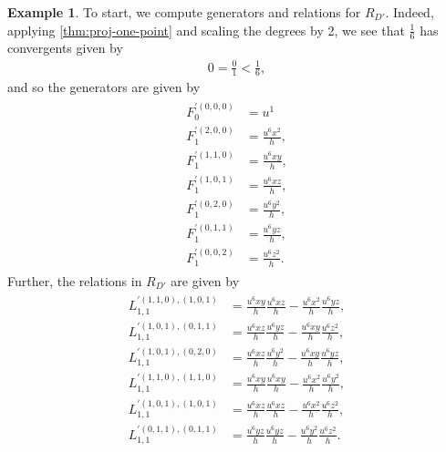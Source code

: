 \documentclass{amsart}
\theoremstyle{plain}
\theoremstyle{definition}
\newtheorem{example}[thm]{Example}
\theoremstyle{remark}
\numberwithin{equation}{subsection}
\begin{document}
\begin{example}
	To start, we compute generators and relations for $R_{D'}$.
	Indeed, applying \ref{thm:proj-one-point} and scaling
	the degrees by 2, we see that $\frac{1}{6}$ has convergents
	given by
	\begin{align*}
		0 = \frac{0}{1} < \frac{1}{6},
	\end{align*}
	and so the generators are given by 
	\begin{align}
	\begin{aligned}
	\label{equation:d'-generators}
		F_0^{'(0,0,0)} &= u^1 \\
		F_1^{'(2,0,0)} &= \frac{u^6 x^2}{h}, \\
		F_1^{'(1,1,0)} &= \frac{u^6 xy}{h}, \\ 
		F_1^{'(1,0,1)} &= \frac{u^6 xz}{h}, \\
		F_1^{'(0,2,0)} &= \frac{u^6 y^2}{h}, \\
		F_1^{'(0,1,1)} &= \frac{u^6 yz}{h},  \\
		F_1^{'(0,0,2)} &= \frac{u^6 z^2}{h}.
	\end{aligned}
	\end{align}
Further, the relations in $R_{D'}$ are given by 	
\begin{align}	
			\begin{aligned}
	\label{equation:d'-relations}
		L_{1,1}^{'(1,1,0), (1,0,1)} &= \frac{u^6 xy}{h}\frac{u^6 xz}{h} - \frac{u^6x^2}{h}\frac{u^6yz}{h},\\
		L_{1,1}^{'(1,0,1), (0,1,1)} &= \frac{u^6 xz}{h}\frac{u^6 yz}{h} - \frac{u^6xy}{h}\frac{u^6z^2}{h},\\
		L_{1,1}^{'(1,0,1), (0,2,0)} &= \frac{u^6 xz}{h}\frac{u^6 y^2}{h} - \frac{u^6xy}{h}\frac{u^6yz}{h}, \\
		L_{1,1}^{'(1,1,0), (1,1,0)} &= \frac{u^6 xy}{h}\frac{u^6 xy}{h} - \frac{u^6x^2}{h}\frac{u^6y^2}{h}, \\
		L_{1,1}^{'(1,0,1), (1,0,1)} &= \frac{u^6 xz}{h}\frac{u^6 xz}{h} - \frac{u^6x^2}{h}\frac{u^6z^2}{h}, \\
		L_{1,1}^{'(0,1,1), (0,1,1)} &= \frac{u^6 yz}{h}\frac{u^6 yz}{h} - \frac{u^6y^2}{h}\frac{u^6z^2}{h}.
\end{aligned}
\end{align}


\end{example}
\end{document}
